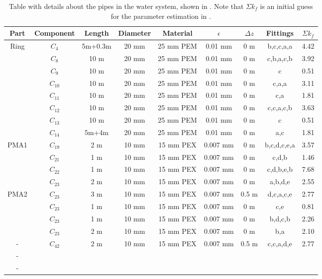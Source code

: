 \begin{table}[]
\centering
\begin{adjustbox}{max width=\textwidth}
\begin{tabular}{c|c|c|c|c|c|c|c|c}
Part & Component & Length & Diameter & Material & $\epsilon$ & $\Delta z$& Fittings   & $\Sigma k_f$  \\\hline
Ring & $C_4$ 	 & 5m+0.3m& 20 mm 	 & 25 mm PEM& 0.01 mm 	 & 0 m 		 & b,c,c,a,a  &  4.42  		  \\ %
 	 & $C_8$ 	 & 10 m	  & 20 mm 	 & 25 mm PEM& 0.01 mm 	 & 0 m 	 	 & c,b,a,c,b  &  3.92  		  \\
 	 & $C_9$ 	 & 10 m	  & 20 mm 	 & 25 mm PEM& 0.01 mm 	 & 0 m 		 & c 	      &  0.51 		  \\
	 & $C_{10}$  & 10 m	  & 20 mm 	 & 25 mm PEM& 0.01 mm 	 & 0 m 		 & c,a,a 	  &  3.11 		  \\
 	 & $C_{11}$  & 10 m	  & 20 mm 	 & 25 mm PEM& 0.01 mm 	 & 0 m 		 & c,a 		  &  1.81 		  \\
 	 & $C_{12}$  & 10 m	  & 20 mm 	 & 25 mm PEM& 0.01 mm 	 & 0 m 		 & c,c,a,c,b  &  3.63		  \\
 	 & $C_{13}$  & 10 m   & 20 mm 	 & 25 mm PEM& 0.01 mm 	 & 0 m 		 & c 		  &  0.51		  \\
 	 & $C_{14}$  & 5m+4m  & 20 mm 	 & 25 mm PEM& 0.01 mm 	 & 0 m 		 & a,c 		  &  1.81  		  \\ \hline
PMA1 & $C_{19}$	 & 2 m 	  & 10 mm    & 15 mm PEX& 0.007 mm   & 0 m 		 & b,c,d,c,e,a&  3.57 		  \\ %
	 & $C_{21}$  & 1 m 	  & 10 mm    & 15 mm PEX& 0.007 mm   & 0 m 		 & c,d,b 	  &  1.46 		  \\
 	 & $C_{22}$  & 1 m 	  & 10 mm    & 15 mm PEX& 0.007 mm   & 0 m 		 & c,d,b,e,b  &  7.68  		  \\
 	 & $C_{23}$  & 2 m 	  & 10 mm    & 15 mm PEX& 0.007 mm   & 0 m 		 & a,b,d,e    &  2.55  		  \\ \hline
PMA2 & $C_{23}$  & 3 m	  & 10 mm    & 15 mm PEX& 0.007 mm   & 0.5 m  	 & d,c,a,c,e  &  2.77	      \\
 	 & $C_{23}$  & 1 m 	  & 10 mm    & 15 mm PEX& 0.007 mm   & 0 m 		 & c,e 		  &  0.81    	  \\
 	 & $C_{23}$  & 1 m 	  & 10 mm    & 15 mm PEX& 0.007 mm   & 0 m 	   	 & b,d,c,b 	  &  2.26     	  \\
 	 & $C_{23}$  & 2 m 	  & 10 mm    & 15 mm PEX& 0.007 mm   & 0 m 		 & b,a 		  &  2.10    	  \\ \hline
- 	 & $C_{42}$  & 2 m    & 10 mm 	 & 15 mm PEX& 0.007 mm   & 0.5 m 	 & c,c,a,d,e  &  2.77 		  \\
- 	 &  &  &  &  &  &  &    \\
- 	 &  &  &  &  &  &  &   
\end{tabular}
\end{adjustbox}
\caption{Table with details about the pipes in the water system, shown in . Note that $\Sigma k_f$ is an initial guess for the parameter estimation in .}
\label{tab:pip_detail}
\end{table}

